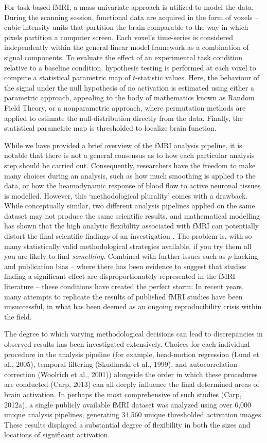 For task-based fMRI, a mass-univariate approach is utilized to model the data. During the scanning session, functional data are acquired in the form of voxels -- cubic intensity units that partition the brain comparable to the way in which pixels partition a computer screen. Each voxel's time-series is considered independently within the general linear model framework as a combination of signal components. To evaluate the effect of an experimental task condition relative to a baseline condition, hypothesis testing is performed at each voxel to compute a statistical parametric map of $t$-statistic values. Here, the behaviour of the signal under the null hypothesis of no activation is estimated using either a parametric approach, appealing to the body of mathematics known as Random Field Theory, or a nonparametric approach, where permutation methods are applied to estimate the null-distribution directly from the data. Finally, the statistical parametric map is thresholded to localize brain function. 

While we have provided a brief overview of the fMRI analysis pipeline, it is notable that there is not a general consensus as to how each particular analysis step should be carried out. Consequently, researchers have the freedom to make many choices during an analysis, such as how much smoothing is applied to the data, or how the heamodynamic response of blood flow to active neuronal tissues is modelled. However, this `methodological plurality' comes with a drawback. While conceptually similar, two different analysis pipelines applied on the same dataset may not produce the same scientific results, and mathematical modelling has shown that the high analytic flexibility associated with fMRI can potentially distort the final scientific findings of an investigation \citep{Ioannidis2005-sy}. The problem is, with so many statistically valid methodological strategies available, if you try them all you are likely to find \textit{something}. Combined with further issues such as $p$-hacking and publication bias -- where there has been evidence to suggest that studies finding a significant effect are disproportionately represented in the fMRI literature -- these conditions have created the perfect storm: In recent years, many attempts to replicate the results of published fMRI studies have been unsuccessful, in what has been deemed as an ongoing reproducibility crisis within the field. 

The degree to which varying methodological decisions can lead to discrepancies in observed results has been investigated extensively. Choices for each individual procedure in the analysis pipeline (for example, head-motion regression (Lund et al., 2005), temporal filtering (Skudlarski et al., 1999), and autocorrelation correction (Woolrich et al., 2001)) alongside the order in which these procedures are conducted (Carp, 2013) can all deeply influence the final determined areas of brain activation. In perhaps the most comprehensive of such studies (Carp, 2012a), a single publicly available fMRI dataset was analyzed using over 6,000 unique analysis pipelines, generating 34,560 unique thresholded activation images. These results displayed a substantial degree of flexibility in both the sizes and locations of significant activation.


